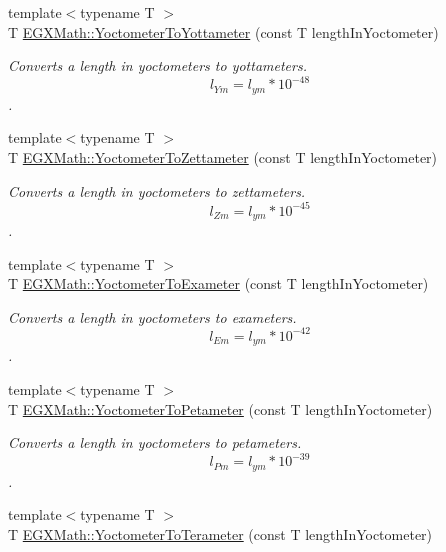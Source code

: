 \begin{DoxyCompactItemize}
{\footnotesize template$<$typename T $>$ }\\T \mbox{\hyperlink{group___e_g_x_math-_conversions-_length_conversions-_s_i-_yoctometer-_s_i_ga6b9cdc15eb83cf15afe2a52430c84dc0}{E\+G\+X\+Math\+::\+Yoctometer\+To\+Yottameter}} (const T length\+In\+Yoctometer)
\begin{DoxyCompactList}\small\item\em Converts a length in yoctometers to yottameters. \[ l_{Ym}=l_{ym} * 10^{-48} \]. \end{DoxyCompactList}\item 
{\footnotesize template$<$typename T $>$ }\\T \mbox{\hyperlink{group___e_g_x_math-_conversions-_length_conversions-_s_i-_yoctometer-_s_i_gab7fc23a884fab0c6248edee754bd6e25}{E\+G\+X\+Math\+::\+Yoctometer\+To\+Zettameter}} (const T length\+In\+Yoctometer)
\begin{DoxyCompactList}\small\item\em Converts a length in yoctometers to zettameters. \[ l_{Zm}=l_{ym} * 10^{-45} \]. \end{DoxyCompactList}\item 
{\footnotesize template$<$typename T $>$ }\\T \mbox{\hyperlink{group___e_g_x_math-_conversions-_length_conversions-_s_i-_yoctometer-_s_i_ga2ffb14b252f7cc426a761de3930449a1}{E\+G\+X\+Math\+::\+Yoctometer\+To\+Exameter}} (const T length\+In\+Yoctometer)
\begin{DoxyCompactList}\small\item\em Converts a length in yoctometers to exameters. \[ l_{Em}=l_{ym} * 10^{-42} \]. \end{DoxyCompactList}\item 
{\footnotesize template$<$typename T $>$ }\\T \mbox{\hyperlink{group___e_g_x_math-_conversions-_length_conversions-_s_i-_yoctometer-_s_i_ga8336f2eef297fcf72ddb1fc0f79dfa5e}{E\+G\+X\+Math\+::\+Yoctometer\+To\+Petameter}} (const T length\+In\+Yoctometer)
\begin{DoxyCompactList}\small\item\em Converts a length in yoctometers to petameters. \[ l_{Pm}=l_{ym} * 10^{-39} \]. \end{DoxyCompactList}\item 
{\footnotesize template$<$typename T $>$ }\\T \mbox{\hyperlink{group___e_g_x_math-_conversions-_length_conversions-_s_i-_yoctometer-_s_i_gae5313d3fbe14e0cbb4b58d4d432857e1}{E\+G\+X\+Math\+::\+Yoctometer\+To\+Terameter}} (const T length\+In\+Yoctometer)

\end{DoxyCompactItemize}
